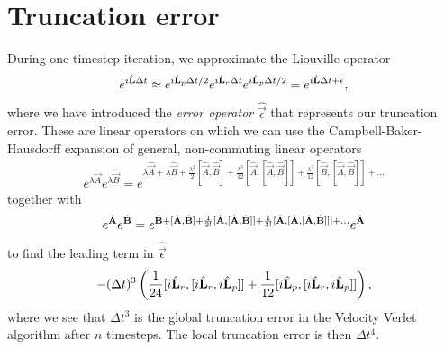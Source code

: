 \section{Truncation error}
\label{sec:velocity_verlet_error}
During one timestep iteration, we approximate the Liouville operator
\begin{align}
	e^{i\hat{\mathbf L} \Delta t} \approx e^{i\hat{\mathbf L}_p \Delta t/2}e^{i\hat{\mathbf L}_r \Delta t}e^{i\hat{\mathbf L}_p \Delta t/2} = e^{i\hat{\mathbf L} \Delta t + \hat{\mathbf \epsilon}},
\end{align}
where we have introduced the \textit{error operator} $\hat{\vec \epsilon}$ that represents our truncation error. These are linear operators on which we can use the Campbell-Baker-Hausdorff expansion of general, non-commuting linear operators
\begin{align}
	e^{\lambda\hat{\vec A}}e^{\lambda\hat{\vec B}} = e^{\lambda\hat{\vec A} + \lambda\hat{\vec B} + \frac{\lambda^2}{2}[\hat{\vec A},\hat{\vec B}] + \frac{\lambda^3}{12}[\hat{\vec A},[\hat{\vec A},\hat{\vec B}]] + \frac{\lambda^3}{12}[\hat{\vec B},[\hat{\vec A},\hat{\vec B}]] + ...}
\end{align}
together with 
\begin{align}
	e^{\hat{\mathbf{A}}}e^{\hat{\mathbf{B}}} = e^{\hat{\mathbf{B}} + [\hat{\mathbf{A}},\hat{\mathbf{B}}] + \frac{1}{2!}[\hat{\mathbf{A}},[\hat{\mathbf{A}},\hat{\mathbf{B}}]] + \frac{1}{3!}[\hat{\mathbf{A}},[\hat{\mathbf{A}},[\hat{\mathbf{A}},\hat{\mathbf{B}}]]] + ...}e^{\hat{\mathbf{A}}}
\end{align}
to find the leading term in $\hat{\vec \epsilon}$
\begin{align}
	-(\Delta t)^3\left(\frac{1}{24}[i\hat{\mathbf L}_r, [i\hat{\mathbf L}_r, i\hat{\mathbf L}_p]] + \frac{1}{12}[i\hat{\mathbf L}_p, [i\hat{\mathbf L}_r, i\hat{\mathbf L}_p]]\right),
\end{align}
where we see that $\Delta t^3$ is the global truncation error in the Velocity Verlet algorithm after $n$ timesteps. The local truncation error is then $\Delta t^4$.
